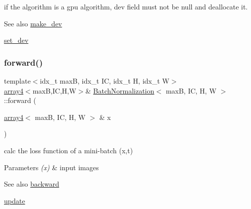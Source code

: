 if the algorithm is a gpu algorithm, dev field must not be null and deallocate it. 

\begin{DoxySeeAlso}{See also}
\hyperlink{structBatchNormalization_a0d925e23b6e4d49e64319dd02d93b480}{make\+\_\+dev} 

\hyperlink{structBatchNormalization_a05caf41d5a21914b07652d356fde7387}{set\+\_\+dev} 
\end{DoxySeeAlso}
\mbox{\label{structBatchNormalization_a315cda9d48dfa18a2f4f65ac7bb3b891}} 
\subsubsection{\texorpdfstring{forward()}{forward()}}
{\footnotesize\ttfamily template$<$idx\+\_\+t maxB, idx\+\_\+t IC, idx\+\_\+t H, idx\+\_\+t W$>$ \\
\hyperlink{structarray4}{array4}$<$maxB,IC,H,W$>$\& \hyperlink{structBatchNormalization}{Batch\+Normalization}$<$ maxB, IC, H, W $>$\+::forward (\begin{DoxyParamCaption}\item[{\hyperlink{structarray4}{array4}$<$ maxB, IC, H, W $>$ \&}]{x }\end{DoxyParamCaption})\hspace{0.3cm}{\ttfamily [inline]}}



calc the loss function of a mini-\/batch (x,t) 


\begin{DoxyParams}{Parameters}
{\em (x)} & input images \\
\hline
\end{DoxyParams}
\begin{DoxySeeAlso}{See also}
\hyperlink{structBatchNormalization_a3b6d987026effdc6c3a2c99e54ae58f9}{backward} 

\hyperlink{structBatchNormalization_a71b4c3d0b5002d84ba2d74f47f7ab8d2}{update} 
\end{DoxySeeAlso}
\mbox{\label{structBatchNormalization_a95b82689b898e3e9940a98a0145eb6ca}} 
